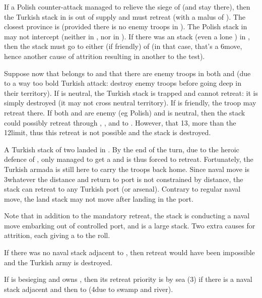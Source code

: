 \begin{exemple}
  If a Polish counter-attack managed to relieve the siege of \provinceBanat (and
  stay there), then the Turkish stack in \provinceMagyarorszag is out of
  supply and must retreat (with a malus of ). The closest province
  is \provinceSerbia (provided there is no enemy troops in
  \provinceCroatie). The Polish stack in \provinceBanat may not intercept
  (neither in \provinceCroatie, nor in \provinceSerbia). If there was an
  \paysHongrie stack (even a lone \LD) in \provinceCroatie, then the stack
  must go to either \provinceMoldova (if friendly) of \provinceValahia (in
  that case, that's a 6\MP move, hence another cause of attrition resulting in
  another  to the test).
\end{exemple}  

\begin{exemple}
  Suppose now that \provinceDalmacija belongs to \VEN and that there are enemy
  troops in both \provinceCroatie and \provinceErdely (due to a way too bold
  Turkish attack: destroy enemy troops before going deep in their
  territory). If \paysMoldavie is neutral, the Turkish stack is trapped and
  cannot retreat: it is simply destroyed (it may not cross neutral
  territory). If \provinceMoldova is friendly, the troop may retreat there. If
  both \provinceMoldova and \provinceBasarabia are enemy (eg Polish) and
  \provinceValahia is neutral, then the stack could possibly retreat through
  \provinceKarpatok, \provinceBukovina, \provinceMoldova and
  \provinceBasarabia to \provinceRumeli. However, that 13\MP, more than the
  12\MP limit, thus this retreat is not possible and the stack is destroyed.
\end{exemple}  

\begin{exemple}
  A Turkish stack of two \Janissaire \ARMY\Faceplus landed in
  \provinceMalta. By the end of the turn, due to the heroic defence of
  , \TUR only managed to get a \USURE\Facemoins and is thus
  forced to retreat. Fortunately, the Turkish armada is still here to carry
  the troops back home. Since naval move is 3\MP whatever the distance and
  return to port is not constrained by distance, the stack can retreat to any
  Turkish port (or arsenal). Contrary to regular naval move, the land stack
  may not move after landing in the port.

  Note that in addition to the mandatory retreat, the stack is conducting a
  naval move embarking out of controlled port, and is a large stack. Two extra
  causes for attrition, each giving a  to the roll.

  If there was no naval stack adjacent to \provinceMalta, then retreat would
  have been impossible and the Turkish army is destroyed.

  If \SUE is besieging \provinceDanzig and owns \provinceHinterpommern, then
  its retreat priority is by sea (3\MP) if there is a naval stack adjacent and
  then to \provinceHinterpommern (4\MP due to swamp and river).
\end{exemple}

